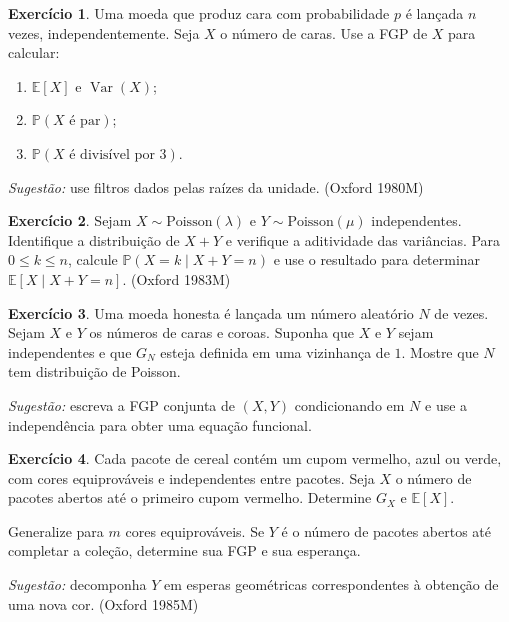 \documentclass[12pt,portuguese]{article}
\theoremstyle{definition}
\theoremstyle{plainexercise}
\newtheorem{exercise}{Exercício}
\theoremstyle{starredexercise}
\newtheorem{starredexercise}[exercise]{Exercício}
\theoremstyle{definition}
\begin{document}
\begin{exercise}\label{exercise:gw-prob-6}
Uma moeda que produz cara com probabilidade $p$ é lançada $n$ vezes,
independentemente. Seja $X$ o número de caras. Use a FGP de $X$ para calcular:
\begin{enumerate}[label=(\alph*)]
\item $\mathbb{E}[X]$ e $\operatorname{Var}(X)$;
\item $\mathbb{P}(X\text{ é par})$;
\item $\mathbb{P}(X\text{ é divisível por }3)$.
\end{enumerate}
\emph{Sugestão:} use filtros dados pelas raízes da unidade.
(Oxford 1980M)
\end{exercise}

\begin{exercise}\label{exercise:gw-prob-7}
Sejam $X\sim\mathrm{Poisson}(\lambda)$ e
$Y\sim\mathrm{Poisson}(\mu)$ independentes. Identifique a distribuição de
$X+Y$ e verifique a aditividade das variâncias. Para
$0\leqslant k\leqslant n$, calcule
$\mathbb{P}(X=k\mid X+Y=n)$ e use o resultado para determinar
$\mathbb{E}[X\mid X+Y=n]$. (Oxford 1983M)
\end{exercise}

\begin{starredexercise}\label{exercise:gw-prob-8}
Uma moeda honesta é lançada um número aleatório $N$ de vezes. Sejam $X$ e $Y$
os números de caras e coroas. Suponha que $X$ e $Y$ sejam independentes e que
$G_N$ esteja definida em uma vizinhança de $1$. Mostre que $N$ tem
distribuição de Poisson.

\emph{Sugestão:} escreva a FGP conjunta de $(X,Y)$ condicionando em $N$ e use
a independência para obter uma equação funcional.
\end{starredexercise}

\begin{exercise}\label{exercise:gw-prob-9}
Cada pacote de cereal contém um cupom vermelho, azul ou verde, com cores
equiprováveis e independentes entre pacotes. Seja $X$ o número de pacotes
abertos até o primeiro cupom vermelho. Determine $G_X$ e $\mathbb{E}[X]$.

Generalize para $m$ cores equiprováveis. Se $Y$ é o número de pacotes abertos
até completar a coleção, determine sua FGP e sua esperança.

\emph{Sugestão:} decomponha $Y$ em esperas geométricas correspondentes à
obtenção de uma nova cor. (Oxford 1985M)
\end{exercise}
\end{document}
